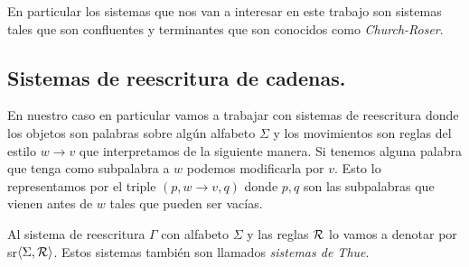 \documentclass[tesis.tex]{subfiles}
\begin{document}
En particular los sistemas que nos van a interesar en este trabajo son sistemas tales que son confluentes y terminantes que son conocidos como \emph{Church-Roser}.

\subsection{Sistemas de reescritura de cadenas.}
En nuestro caso en particular vamos a trabajar con sistemas de reescritura donde los objetos son palabras sobre algún alfabeto $\Sigma$ y los movimientos son reglas del estilo $w \to v$ que interpretamos de la siguiente manera. Si tenemos alguna palabra que tenga como subpalabra a $w$ podemos modificarla por $v$. Esto lo representamos por el triple $(p, w \to v, q)$ donde $p,q$ son las subpalabras que vienen antes de $w$ tales que pueden ser vacías. 

Al sistema de reescritura $\Gamma$ con alfabeto $\Sigma$ y las reglas $\cal R$ lo vamos a denotar por sr$\left< \Sigma, {\cal R} \right>$. Estos sistemas también son llamados \emph{sistemas de Thue}.
\end{document}
